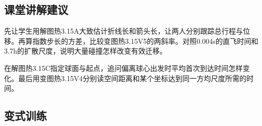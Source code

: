\documentclass[UTF8,fontset=fandol,a4paper,11pt]{ctexart}
\begin{document}


\subsection*{课堂讲解建议}

先让学生用解图热3.15A大致估计折线长和箭头长，让两人分别跟踪总行程与位移。再算指数步长的方差，比较变图热3.15V5的两斜率。对照0.004s的直飞时间和3.7h的扩散尺度，说明大量碰撞怎样改变有效迁移。

在解图热3.15C指定球面与起点，追问偏离球心出发时平均首次到达时间怎样变化。最后用变图热3.15V4分别读空间距离和某个坐标达到同一方均尺度所需的时间。



\subsection*{变式训练}
\end{document}
